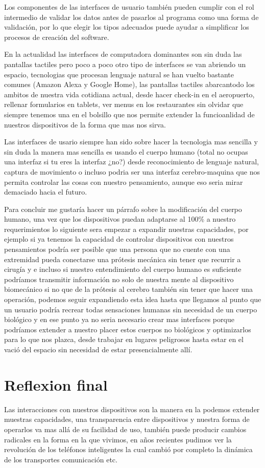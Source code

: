 \documentclass[12pt]{article}
\begin{document}
Los componentes de las interfaces de usuario también pueden cumplir con el rol intermedio de validar los datos antes de pasarlos al programa como una forma de validación, por lo que elegir los tipos adecuados puede ayudar a simplificar los procesos de creación del software.

En la actualidad las interfaces de computadora dominantes son sin duda las pantallas tactiles pero poco a poco otro tipo de interfaces se van abriendo un espacio, tecnologias que procesan lenguaje natural se han vuelto bastante comunes (Amazon Alexa y Google Home), las pantallas tactiles abarcantodo los ambitos de nuestra vida cotidiana actual, desde hacer check-in en el aeropuerto, rellenar formularios en tablets, ver menus en los restaurantes sin olvidar que siempre tenemos una en el bolsillo que nos permite extender la funcioanlidad de nuestros dispositivos de la forma que mas nos sirva.

Las interfaces de usario siempre han sido sobre hacer la tecnologia mas sencilla y sin duda la manera mas sencilla es usando el cuerpo humano (total no ocupas una interfaz si tu eres la interfaz ¿no?) desde reconocimiento de lenguaje natural, captura de movimiento o incluso podria ser una interfaz cerebro-maquina que nos permita controlar las cosas con nuestro pensamiento, aunque eso seria mirar demaciado hacia el futuro.

Para concluir me gustaría hacer un párrafo sobre la modificación del cuerpo humano, una vez que los dispositivos puedan adaptarse al 100\% a nuestro requerimientos lo siguiente sera empezar a expandir nuestras capacidades, por ejemplo si ya tenemos la capacidad de controlar dispositivos con nuestros pensamientos podría ser posible que una persona que no cuente con una extremidad pueda conectarse una prótesis mecánica sin tener que recurrir a cirugía y e incluso si nuestro entendimiento del cuerpo humano es suficiente podríamos transmitir información no solo de nuestra mente al dispositivo biomecánico si no que de la prótesis al cerebro también sin tener que hacer una operación, podemos seguir expandiendo esta idea hasta que llegamos al punto que un usuario podría recrear todas sensaciones humanas sin necesidad de un cuerpo biológico y en ese punto ya no seria necesario crear mas interfaces porque podríamos extender a nuestro placer estos cuerpos no biológicos y optimizarlos para lo que nos plazca, desde trabajar en lugares peligrosos hasta estar en el vació del espacio sin necesidad de estar presencialmente allí.

\section*{Reflexion final}
\label{sec:org7b5a8cf}
Las interacciones con nuestros dispositivos son la manera en la podemos extender muestras capacidades, una transparencia entre dispositivos y nuestra forma de operarlos va mas allá de su facilidad de uso, también puede producir cambios radicales en la forma en la que vivimos, en años recientes pudimos ver la revolución de los teléfonos inteligentes la cual cambió por completo la dinámica de los transportes comunicación etc. 
\end{document}
